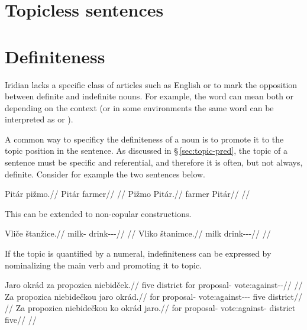 \section{Topicless sentences}\label{sec:topicless}

\section{Definiteness}\label{sec:definiteness}

Iridian lacks a specific class of articles such as English
 or  to mark the opposition between definite and indefinite
nouns. For example, the word  can mean both  or  depending on the context (or in some environments the same word can be
interpreted as   or ).

A common way to specificy the definiteness of a noun is to promote it to the
topic position in the sentence. As discussed in \S\,\ref{sec:topic-pred}, the
topic of a sentence must be specific and referential, and therefore it is often,
but not always, definite. Consider for example the two sentences below.

\begin{multicols}{2}
  \pex
  \a
  \begingl
  \gla Pitár pižmo.//
  \glb Pitár farmer//
  \glft {}//
  \endgl
  \a
  \begingl
  \gla Pižmo Pitár.//
  \glb farmer Pitár//
  \glft {}//
  \endgl
  \xe
\end{multicols}

This can be extended to non-copular constructions.

\begin{multicols}{2}
  \pex
  \a
  \begingl
  \gla Vliče štanžice.//
  \glb milk-\Gen{} drink-\Av{}-\Pf{}-\Quot{}//
  \glft {}//
  \endgl
  \a
  \begingl
  \gla Vliko štanimce.//
  \glb milk drink-\Pv{}-\Pf{}-\Quot{}//
  \glft {}//
  \endgl
  \xe
\end{multicols}

If the topic is quantified by a numeral, indefiniteness can be expressed by nominalizing the main verb and promoting it to topic.

\pex
\a
\begingl
\gla Jaro okrád za propozica niebidček.//
\glb five district for proposal-\Pat{} vote:against-\Av{}-\Pf{}//
\glft {}//
\endgl
\a
\begingl
\gla Za propozica niebidečkou jaro okrád.//
\glb for proposal-\Pat{} vote:against-\Av{}-\Pf{}-\Nz{} five district//
\glft {}//
\endgl
\a
\begingl
\gla Za propozica niebidečkou ko okrád jaro.//
\glb for proposal-\Pat{} vote:against-  district five//
\glft {}//
\endgl
\xe

